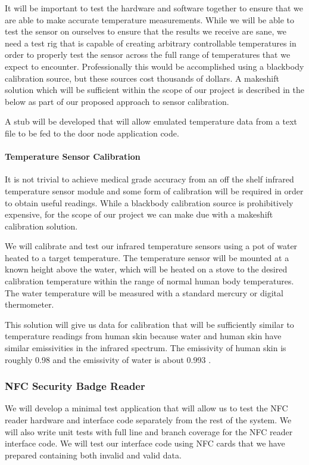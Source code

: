It will be important to test the hardware and software together to ensure that
we are able to make accurate temperature measurements. While we will be able to
test the sensor on ourselves to ensure that the results we receive are sane, we
need a test rig that is capable of creating arbitrary controllable temperatures
in order to properly test the sensor across the full range of temperatures that
we expect to encounter. Professionally this would be accomplished using a
blackbody calibration source, but these sources cost thousands of dollars. A
makeshift solution which will be sufficient within the scope of our project is
described in the below as part of our proposed approach to sensor calibration.

A stub will be developed that will allow emulated temperature data from a text
file to be fed to the door node application code.

\paragraph{Temperature Sensor Calibration}
It is not trivial to achieve medical grade accuracy from an off the shelf
infrared temperature sensor module and some form of calibration will be required
in order to obtain useful readings. While a blackbody calibration source is
prohibitively expensive, for the scope of our project we can make due with a
makeshift calibration solution.

We will calibrate and test our infrared temperature sensors using a pot of water
heated to a target temperature. The temperature sensor will be mounted at a
known height above the water, which will be heated on a stove to the desired
calibration temperature within the range of normal human body temperatures.
The water temperature will be measured with a standard mercury or digital
thermometer.

This solution will give us data for calibration that will be sufficiently
similar to temperature readings from human skin because water and human skin
have similar emissivities in the infrared spectrum. The emissivity of human skin
is roughly 0.98 \cite{Steketee_1973} and the emissivity of water is about 0.993
\cite{Buettner_1965}.

\subsubsection{NFC Security Badge Reader}

We will develop a minimal test application that will allow us to test the NFC
reader hardware and interface code separately from the rest of the system. We
will also write unit tests with full line and branch coverage for the NFC reader
interface code. We will test our interface code using NFC cards that we have
prepared containing both invalid and valid data.

